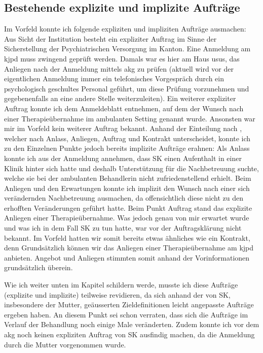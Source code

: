 \subsection{Bestehende explizite und implizite Aufträge} 
Im Vorfeld konnte ich folgende expliziten und impliziten Aufträge ausmachen: Aus Sicht der Institution besteht ein expliziter Auftrag im Sinne der Sicherstellung der Psychiatrischen Versorgung im Kanton. Eine Anmeldung am \ac{kjpd} muss zwingend geprüft werden. Damals war es hier am Haus usus, das Anliegen nach der Anmeldung mittels \ac{akg} zu prüfen (aktuell wird vor der eigentlichen Anmeldung immer ein telefonisches Vorgespräch durch ein psychologisch geschultes Personal geführt, um diese Prüfung vorzunehmen und gegebenenfalls an eine andere Stelle weiterzuleiten). Ein weiterer expliziter Auftrag konnte ich dem Anmeldeblatt entnehmen, auf dem der Wunsch nach einer Therapieübernahme im ambulanten Setting genannt wurde. Ansonsten war mir im Vorfeld kein weiterer Auftrag bekannt. Anhand der Einteilung nach , welcher nach Anlass, Anliegen, Auftrag und Kontrakt unterscheidet, konnte ich zu den Einzelnen Punkte jedoch bereits implizite Aufträge erahnen: Als Anlass konnte ich aus der Anmeldung annehmen, dass SK einen Aufenthalt in einer Klinik hinter sich hatte und deshalb Unterstützung für die Nachbetreuung suchte, welche sie bei der ambulanten Behandlerin nicht zufriedenstellend erhielt. Beim Anliegen und den Erwartungen konnte ich implizit den Wunsch nach einer sich verändernden Nachbetreuung ausmachen, da offensichtlich diese nicht zu den erhofften Veränderungen geführt hatte. Beim Punkt Auftrag stand das explizite Anliegen einer Therapieübernahme. Was jedoch genau von mir erwartet wurde und was ich in dem Fall SK zu tun hatte, war vor der Auftragsklärung nicht bekannt. Im Vorfeld hatten wir somit bereits etwas ähnliches wie ein Kontrakt, denn Grundsätzlich können wir das Anliegen einer Therapieübernahme am \ac{kjpd} anbieten. Angebot und Anliegen stimmten somit anhand der Vorinformationen grundsätzlich überein.  

Wie ich weiter unten im Kapitel  schildern werde, musste ich diese Aufträge (explizite und implizite) teilweise revidieren, da sich anhand der von SK, insbesondere der Mutter, geäusserten Zieldefinitionen leicht angepasste Aufträge ergeben haben. An diesem Punkt sei schon verraten, dass sich die Aufträge im Verlauf der Behandlung noch einige Male veränderten. Zudem konnte ich vor dem \ac{akg} noch keinen expliziten Auftrag von SK ausfindig machen, da die Anmeldung durch die Mutter vorgenommen wurde. 

